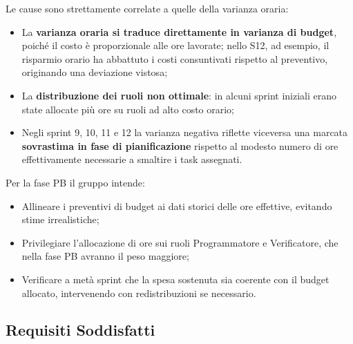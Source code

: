 \documentclass[a4paper,11pt,oneside]{scrartcl}
\begin{document}
Le cause sono strettamente correlate a quelle della varianza oraria:
\begin{itemize}
    \item La \textbf{varianza oraria si traduce direttamente in varianza di budget}, poiché il costo è proporzionale alle ore lavorate; nello S12, ad esempio, il risparmio orario ha abbattuto i costi consuntivati rispetto al preventivo, originando una deviazione vistosa;
    \item La \textbf{distribuzione dei ruoli non ottimale}: in alcuni sprint iniziali erano state allocate più ore su ruoli ad alto costo orario;
    \item Negli sprint 9, 10, 11 e 12 la varianza negativa riflette viceversa una marcata \textbf{sovrastima in fase di pianificazione} rispetto al modesto numero di ore effettivamente necessarie a smaltire i task assegnati.
\end{itemize}

Per la fase PB il gruppo intende:
\begin{itemize}
    \item Allineare i preventivi di budget ai dati storici delle ore effettive, evitando stime irrealistiche;
    \item Privilegiare l'allocazione di ore sui ruoli Programmatore e Verificatore, che nella fase PB avranno il peso maggiore;
    \item Verificare a metà sprint che la spesa sostenuta sia coerente con il budget allocato, intervenendo con redistribuzioni se necessario.
\end{itemize}

\subsection{Requisiti Soddisfatti}
\end{document}
